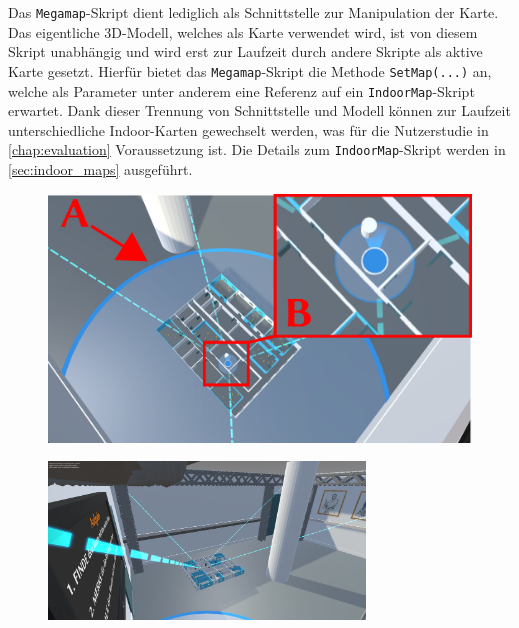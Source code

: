 Das \lstinline|Megamap|-Skript dient lediglich als Schnittstelle zur Manipulation der Karte.
Das eigentliche 3D-Modell, welches als Karte verwendet wird, ist von diesem Skript unabhängig und wird erst zur Laufzeit durch andere Skripte als aktive Karte gesetzt.
Hierfür bietet das \lstinline|Megamap|-Skript die Methode \lstinline|SetMap(...)| an, welche als Parameter unter anderem eine Referenz auf ein \lstinline|IndoorMap|-Skript erwartet.
Dank dieser Trennung von Schnittstelle und Modell können zur Laufzeit unterschiedliche Indoor-Karten gewechselt werden, was für die Nutzerstudie in \autoref{chap:evaluation} Voraussetzung ist.
Die Details zum \lstinline|IndoorMap|-Skript werden in \autoref{sec:indoor_maps} ausgeführt.

\begin{figure}
    \centering
    \begin{minipage}[t]{.485\textwidth}
        \centering
        \vspace{0pt}
        \includegraphics[width=\linewidth]{figures/megamap_user_marker.pdf}
        \label{fig:user_marker}
        \vfill
    \end{minipage}
    \hfill
    \begin{minipage}[t]{.485\textwidth}
        \centering
        \vspace{0pt}
        \includegraphics[width=\linewidth, height=4.2cm]{figures/megamap_room_guides}
        \label{fig:room_guides}
    \end{minipage}
\end{figure}

